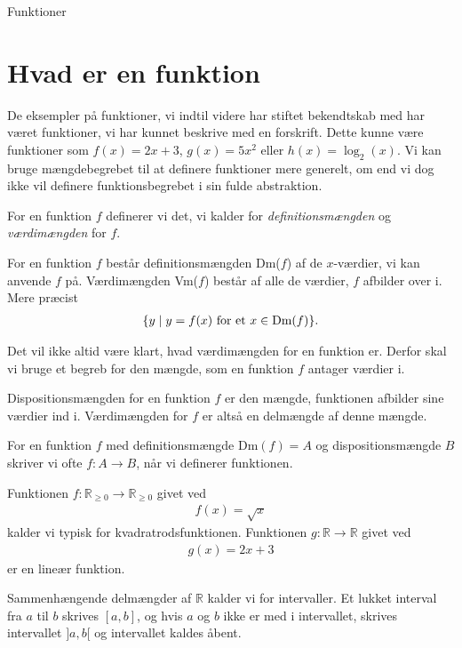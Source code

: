 \begin{center}
\Huge
	Funktioner	
\end{center}

\section*{Hvad er en funktion}

De eksempler på funktioner, vi indtil videre har stiftet bekendtskab med har været funktioner, vi har kunnet beskrive med en forskrift. Dette kunne være funktioner som $f(x) = 2x+3$, $g(x) = 5x^2$ eller $h(x) = \log_2(x)$. Vi kan bruge mængdebegrebet til at definere funktioner mere generelt, om end vi dog ikke vil definere funktionsbegrebet i sin fulde abstraktion. 

For en funktion $f$ definerer vi det, vi kalder for \textit{definitionsmængden} og \textit{værdimængden} for $f$.
\begin{defn}
	For en funktion $f$ består definitionsmængden Dm($f$) af de $x$-værdier, vi kan anvende $f$ på.
	Værdimængden Vm($f$) består af alle de værdier, $f$ afbilder over i. Mere præcist
	\begin{align*}
		\{y  \mid  y = f(x) \textnormal{ for et } x \in \textnormal{Dm}(f)\}.
	\end{align*}
\end{defn}
Det vil ikke altid være klart, hvad værdimængden for en funktion er. Derfor skal vi bruge et begreb for den mængde, som en funktion $f$ antager værdier i. 
\begin{defn}[Dispositionsmængde]
	Dispositionsmængden for en funktion $f$ er den mængde, funktionen afbilder sine værdier ind i. Værdimængden 
	for $f$ er altså en delmængde af denne mængde. 
\end{defn}
For en funktion $f$ med definitionsmængde Dm$(f) = A$ og dispositionsmængde $B$ skriver vi ofte $f:A \to B$, når vi definerer funktionen. 
\begin{exa}
	Funktionen $f: \mathbb{R}_{\geq 0} \to \mathbb{R}_{\geq 0}$ givet ved
	\begin{align*}
		f(x) = \sqrt{x}
	\end{align*}
	kalder vi typisk for kvadratrodsfunktionen. 
	Funktionen $g:\mathbb{R} \to \mathbb{R}$ givet ved
	\begin{align*}
		g(x) = 2x + 3
	\end{align*}
	er en lineær funktion. 
\end{exa}
Sammenhængende delmængder af $\mathbb{R}$ kalder vi for intervaller. Et lukket interval fra $a$ til $b$ skrives $[a,b]$, og hvis $a$ og $b$ ikke er med i intervallet, skrives intervallet $]a,b[$ og intervallet kaldes åbent. 
